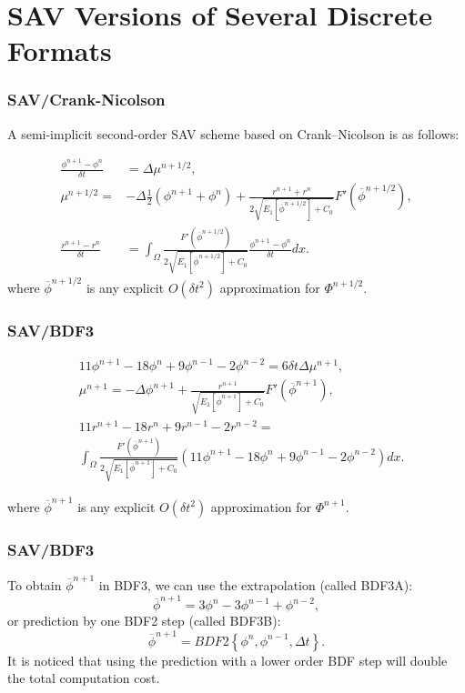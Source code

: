 \documentclass{beamer}
\begin{document}
\section{SAV Versions of Several Discrete Formats}
    \begin{frame}
\frametitle{SAV/Crank-Nicolson}

A semi-implicit second-order SAV scheme based on Crank–Nicolson is as follows:

\begin{equation}\label{SAV-CN}
  \begin{split}
\frac{\phi^{n+1}-\phi^n}{\delta t}&=\Delta\mu^{n+1/2},\\
\mu^{n+1/2}=&-\Delta\frac{1}{2}(\phi^{n+1}+\phi^n)+\frac{r^{n+1}+r^n}{2\sqrt{E_1[\overline{\phi}^{n+1/2}]+C_0}}F'(\overline{\phi}^{n+1/2}),\\
\frac{r^{n+1}-r^n}{\delta t}&=\int_{\Omega}\frac{F'(\overline{\phi}^{n+1/2})}{2\sqrt{E_1[\overline{\phi}^{n+1/2}]+C_0}}\frac{\phi^{n+1}-\phi^n}{\delta t} dx.
  \end{split}
\end{equation}
where $\overline{\phi}^{n+1/2}$ is any explicit $O(\delta t^2)$ approximation for $\Phi^{n+1/2}$.

    \end{frame}
    
    \begin{frame}
\frametitle{SAV/BDF3}
    
    \begin{equation}\label{SAV-BDF3}
  \begin{split}
&11\phi^{n+1}-18\phi^n+9\phi^{n-1}-2\phi^{n-2}=6\delta t\Delta\mu^{n+1},\\
&\mu^{n+1}=-\Delta\phi^{n+1}+\frac{r^{n+1}}{\sqrt{E_1[\overline{\phi}^{n+1}]+C_0}}F'(\overline{\phi}^{n+1}),\\
&11r^{n+1}-18r^n+9r^{n-1}-2r^{n-2}=\\
&\int_{\Omega}\frac{F'(\overline{\phi}^{n+1})}{2\sqrt{E_1[\overline{\phi}^{n+1}]+C_0}}(11\phi^{n+1}-18\phi^n+9\phi^{n-1}-2\phi^{n-2})dx.
  \end{split}
\end{equation}

where $\overline{\phi}^{n+1}$ is any explicit $O(\delta t^2)$ approximation for $\Phi^{n+1}$.
    \end{frame}
    
    \begin{frame}
\frametitle{SAV/BDF3}

    To obtain $\overline{\phi}^{n+1}$ in BDF3, we can use the extrapolation (called BDF3A):
    $$
    \overline{\phi}^{n+1}=3\phi^n-3\phi^{n-1}+\phi^{n-2},
    $$
    or prediction by one BDF2 step (called BDF3B):
    $$
    \overline{\phi}^{n+1}=BDF2\left\{\phi^n,\phi^{n-1},\Delta t\right\}.
    $$
    It is noticed that using the prediction with a lower order BDF step will double the total
computation cost.
    \end{frame}
    
\end{document}
